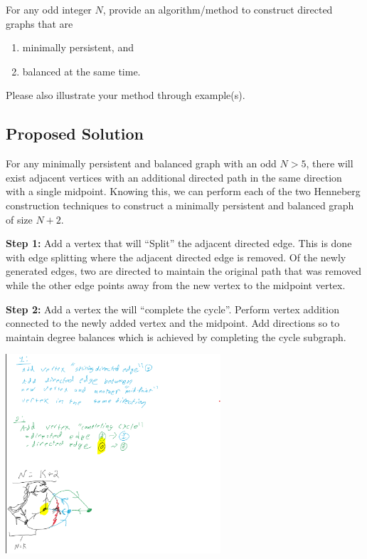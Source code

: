 \documentclass[]{article}
\numberwithin{equation}{section}
\begin{document}
For any odd integer $N$, provide an algorithm/method to construct directed graphs that are \begin{enumerate}
    \item minimally persistent, and 
    \item balanced at the same time.
\end{enumerate}
Please also illustrate your method through example(s).

\subsection*{Proposed Solution}
For any minimally persistent and balanced graph with an odd $N > 5$, there will exist adjacent vertices with an additional directed path in the same direction with a single midpoint.
Knowing this, we can perform each of the two Henneberg construction techniques to construct a minimally persistent and balanced graph of size $N + 2$.

\textbf{Step 1:} 
Add a vertex that will ``Split'' the adjacent directed edge. 
This is done  with edge splitting where the adjacent directed edge is removed. 
Of the newly generated edges, two are directed to maintain the original path that was removed while the other edge points away from the new vertex to the midpoint vertex.

\textbf{Step 2:}
Add a vertex the will ``complete the cycle''. 
Perform vertex addition connected to the newly added vertex and the midpoint. 
Add directions so to maintain degree balances which is achieved by completing the cycle subgraph.

\includegraphics[width=0.6\textwidth]{figs/pblm3_general.png}
\end{document}
